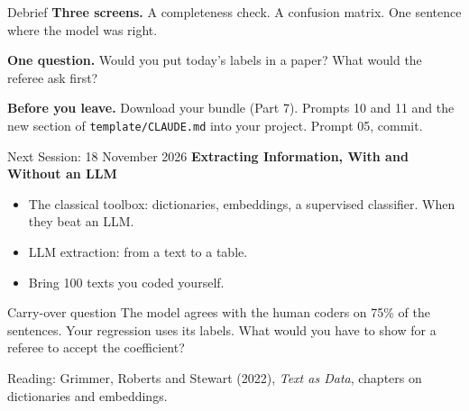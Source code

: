 \documentclass[svgnames,x11names,dvipsnames]{beamer}
\begin{document}
\begin{frame}{Debrief}
\textbf{Three screens.} A completeness check. A confusion matrix. One sentence where the model was right.

\vspace{0.4cm}
\textbf{One question.} Would you put today's labels in a paper? What would the referee ask first?

\vspace{0.4cm}
\textbf{Before you leave.} Download your bundle (Part 7). Prompts 10 and 11 and the new section of \texttt{template/CLAUDE.md} into your project. Prompt 05, commit.
\end{frame}

\begin{frame}{Next Session: 18 November 2026}
\textbf{Extracting Information, With and Without an LLM}

\vspace{0.3cm}
\begin{itemize}
    \setlength{\itemsep}{4pt}
    \item The classical toolbox: dictionaries, embeddings, a supervised classifier. When they beat an LLM.
    \item LLM extraction: from a text to a table.
    \item Bring 100 texts you coded yourself.
\end{itemize}

\vspace{0.4cm}
\begin{alertblock}{Carry-over question}
The model agrees with the human coders on 75\% of the sentences. Your regression uses its labels. What would you have to show for a referee to accept the coefficient?
\end{alertblock}

\vspace{0.2cm}
{\footnotesize Reading: Grimmer, Roberts and Stewart (2022), \textit{Text as Data}, chapters on dictionaries and embeddings.}
\end{frame}
\end{document}
